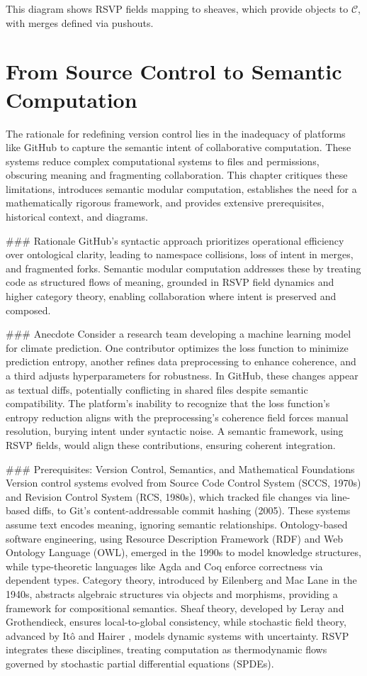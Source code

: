 \documentclass[12pt]{article}
\begin{document}
This diagram shows RSVP fields mapping to sheaves, which provide objects to $\mathcal{C}$, with merges defined via pushouts.

\section{From Source Control to Semantic Computation}
\label{sec:chapter1}

The rationale for redefining version control lies in the inadequacy of platforms like GitHub to capture the semantic intent of collaborative computation. These systems reduce complex computational systems to files and permissions, obscuring meaning and fragmenting collaboration. This chapter critiques these limitations, introduces semantic modular computation, establishes the need for a mathematically rigorous framework, and provides extensive prerequisites, historical context, and diagrams.

### Rationale
GitHub’s syntactic approach prioritizes operational efficiency over ontological clarity, leading to namespace collisions, loss of intent in merges, and fragmented forks. Semantic modular computation addresses these by treating code as structured flows of meaning, grounded in RSVP field dynamics and higher category theory, enabling collaboration where intent is preserved and composed.

### Anecdote
Consider a research team developing a machine learning model for climate prediction. One contributor optimizes the loss function to minimize prediction entropy, another refines data preprocessing to enhance coherence, and a third adjusts hyperparameters for robustness. In GitHub, these changes appear as textual diffs, potentially conflicting in shared files despite semantic compatibility. The platform’s inability to recognize that the loss function’s entropy reduction aligns with the preprocessing’s coherence field forces manual resolution, burying intent under syntactic noise. A semantic framework, using RSVP fields, would align these contributions, ensuring coherent integration.

### Prerequisites: Version Control, Semantics, and Mathematical Foundations
Version control systems evolved from Source Code Control System (SCCS, 1970s) and Revision Control System (RCS, 1980s), which tracked file changes via line-based diffs, to Git’s content-addressable commit hashing (2005). These systems assume text encodes meaning, ignoring semantic relationships. Ontology-based software engineering, using Resource Description Framework (RDF) and Web Ontology Language (OWL), emerged in the 1990s to model knowledge structures, while type-theoretic languages like Agda and Coq enforce correctness via dependent types. Category theory, introduced by Eilenberg and Mac Lane in the 1940s, abstracts algebraic structures via objects and morphisms, providing a framework for compositional semantics. Sheaf theory, developed by Leray and Grothendieck, ensures local-to-global consistency, while stochastic field theory, advanced by Itô and Hairer \cite{hairer2014theory}, models dynamic systems with uncertainty. RSVP integrates these disciplines, treating computation as thermodynamic flows governed by stochastic partial differential equations (SPDEs).
\end{document}
